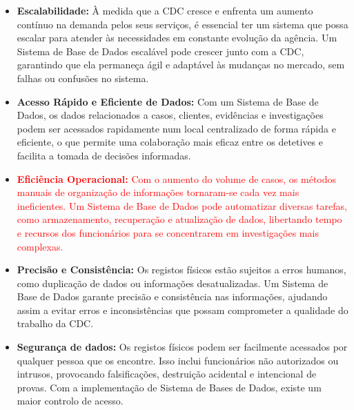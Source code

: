 \documentclass[a4paper,12pt]{scrreprt}
\begin{document}
    \begin{itemize}
        \item \textbf{Escalabilidade:} À medida que a CDC cresce e enfrenta um aumento contínuo na demanda pelos
            seus serviços, é essencial ter um sistema que possa escalar para atender às necessidades em constante
            evolução da agência. Um Sistema de Base de Dados escalável pode crescer junto com a CDC, garantindo que
            ela permaneça ágil e adaptável às mudanças no mercado, sem falhas ou confusões no sistema.
        \item \textbf{Acesso Rápido e Eficiente de Dados:} Com um Sistema de Base de Dados, os dados relacionados a
            casos, clientes, evidências e investigações podem ser acessados rapidamente num local centralizado de
            forma rápida e eficiente, o que permite uma colaboração mais eficaz entre os detetives e facilita a
            tomada de decisões informadas.
        \item \textcolor{red}{
                \textbf{Eficiência Operacional:} Com o aumento do volume de casos, os métodos manuais
                de organização de informações tornaram-se cada vez mais ineficientes. Um Sistema de Base de Dados pode
                automatizar diversas tarefas, como armazenamento, recuperação e atualização de dados, libertando tempo
                e recursos dos funcionários para se concentrarem em investigações mais complexas.
            }
        \item \textbf{Precisão e Consistência:} Os registos físicos estão sujeitos a erros humanos, como duplicação de
            dados ou informações desatualizadas. Um Sistema de Base de Dados garante precisão e consistência nas
            informações, ajudando assim a evitar erros e inconsistências que possam comprometer a qualidade do
            trabalho da CDC.
        \item \textbf{Segurança de dados:} Os registos físicos podem ser facilmente acessados por qualquer pessoa
            que os encontre. Isso inclui funcionários não autorizados ou intrusos, provocando falsificações, destruição
            acidental e intencional de provas. Com a implementação de Sistema de Bases de Dados, existe um maior
            controlo de acesso.
    \end{itemize}
\end{document}

